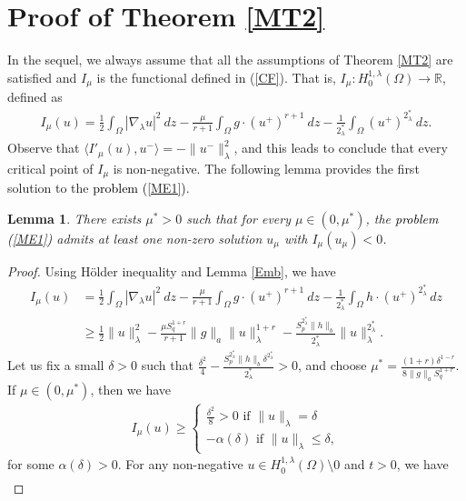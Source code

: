 \documentclass[12pt, notitlepage]{article}
\def\R{\mathbb{R}}
\newtheorem{lem}[theorem]{Lemma}
\begin{document}
{\section{ Proof of Theorem \ref{MT2}}\label{PMT2}
In the sequel, we always assume that all the assumptions of Theorem \ref{MT2} are satisfied and $I_\mu$ is the functional defined in (\ref{CF}). That is, $I_\mu: H^{1,\lambda}_0(\Omega)\to\R$, defined as 
 \begin{align}\label{CF1}
     I_\mu(u)=\frac{1}{2}\int_\Omega |\nabla_\lambda u|^2\ dz-\frac{\mu}{r+1}\int_\Omega g\cdot (u^+)^{r+1}\ dz - \frac{1}{2^*_\lambda}\int_\Omega (u^+)^{2^*_\lambda}\ dz.
 \end{align}
 Observe that $\langle I'_\mu(u),u^-\rangle=-\|u^-\|_\lambda^2$, and this leads to conclude that every critical point of $I_\mu$ is non-negative. The following lemma provides the first solution to the \textcolor{black}{ problem (\ref{ME1})}.
\begin{lem}\label{Fsol}
     There exists $\mu^*>0$ such that for every $\mu\in(0,\mu^*)$, the \textcolor{black}{problem (\ref{ME1})} admits at least one non-zero solution $u_\mu$ with $I_\mu(u_\mu)<0$.
\end{lem}
\begin{proof}
Using H\"{o}lder inequality and Lemma \ref{Emb}, we have 
\begin{align}
    I_\mu(u)&=\frac{1}{2}\int_\Omega |\nabla_\lambda u|^2\ dz-\frac{\mu}{r+1}\int_\Omega g\cdot(u^+)^{r+1}\ dz - \frac{1}{2^*_\lambda}\int_\Omega h\cdot(u^+)^{2^*_\lambda}\, dz\nonumber\\
     &\geq \frac{1}{2}\|u\|_\lambda^2-\frac{\mu S_q^{1+r}}{r+1}\|g\|_a\|u\|_\lambda^{1+r}-\frac{S_p^{2^*_\lambda}\|h\|_b}{2^*_\lambda}\|u\|_\lambda^{2^*_\lambda}.
\end{align}
Let us fix a small $\delta>0$ such that $\frac{\delta^2}{4}-\frac{S_p^{2^*_\lambda}\|h\|_b\delta^{2^*_\lambda}}{2^*_\lambda}>0$, and choose $\mu^*=\frac{(1+r)\delta^{1-r}}{8\|g\|_aS_q^{1+r}}.$ If $\mu\in(0, \mu^*)$, then we have
\begin{align}\label{MP1}
    I_\mu(u)\geq
    \begin{cases}
    \frac{\delta^2}{8}>0 \text{ if } \|u\|_\lambda=\delta\\
    -\alpha(\delta) \text{ if } \|u\|_\lambda\leq\delta,
    \end{cases}
\end{align}
for some $\alpha(\delta)>0$. For any non-negative $u\in H^{1,\lambda}_0(\Omega)\setminus{0}$ and $t>0$, we have
\begin{align}

\end{align}
\end{proof}}
\end{document}
